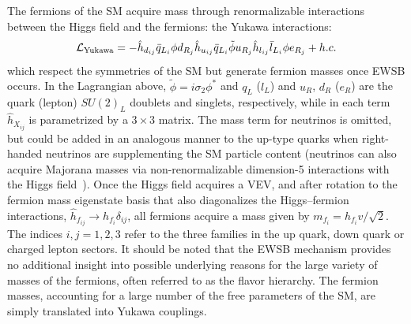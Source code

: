 The fermions of the SM acquire mass through renormalizable interactions between the Higgs field and the fermions: the Yukawa interactions:
\begin{equation}
    \mathcal{L}_\text{Yukawa} = -\hat{h}_{d_{ij}} \bar{q}_{L_i}\phi d_{R_j} \hat{h}_{u_{ij}} \bar{q}_{L_i}\tilde{\phi} u_{R_j} \hat{h}_{l_{ij}} \bar{l}_{L_i}\phi e_{R_j} + h.c.
\end{equation}
which respect the symmetries of the SM but generate fermion masses once EWSB occurs.
In the Lagrangian above, $\tilde{\phi} = i\sigma_2\phi^*$ and $q_L$ ($l_L$) and $u_R$, $d_R$ ($e_R$) are the quark (lepton) $SU(2)_L$ doublets and singlets, respectively, while in each term $\hat{h}_{X_{ij}}$ is parametrized by a $3\times3$ matrix.
The mass term for neutrinos is omitted, but could be added in an analogous manner to the up-type quarks when right-handed neutrinos are supplementing the SM particle content (neutrinos can also acquire Majorana masses via non-renormalizable dimension-5 interactions with the Higgs field~\cite{Weinberg:1979sa}).
Once the Higgs field acquires a VEV, and after rotation to the fermion mass eigenstate basis that also diagonalizes the Higgs--fermion interactions, $\hat{h}_{f_{ij}} \rightarrow h_{f_i} \delta_{ij}$, all fermions acquire a mass given by $m_{f_i} = h_{f_{i}} v/\sqrt{2}$.
The indices $i,j = 1,2,3$ refer to the three families in the up quark, down quark or charged lepton sectors.
It should be noted that the EWSB mechanism provides no additional insight into possible underlying reasons for the large variety of masses of the fermions, often referred to as the flavor hierarchy.
The fermion masses, accounting for a large number of the free parameters of the SM, are simply translated into Yukawa couplings.

